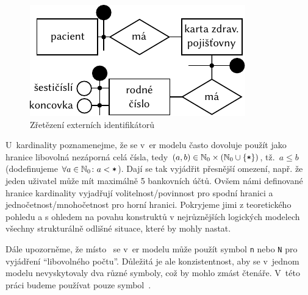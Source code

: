 \begin{figure}[!htb]
  \centering
  \includegraphics[width=\maxwidth{\textwidth}]{../img/er-model/external-id-chain.pdf}
  \caption{Zřetězení externích identifikátorů}
  \label{fig:er-external-identifier-chain}
\end{figure}

U~kardinality poznamenejme, že se v~\acrshort{er} modelu často dovoluje použít jako hranice libovolná nezáporná celá čísla, tedy $(a, b)\in \mathbb N_0\times \left(\mathbb N_0 \cup \left\{\texttt{*}\right\}\right)$, tž.~$a\leq b$ (dodefinujeme $\forall a\in\mathbb N_0\colon a < \texttt{*}$).
Dají se tak vyjádřit přesnější omezení, např. že jeden uživatel může mít maximálně 5 bankovních účtů.
Ovšem námi definované hranice kardinality vyjadřují volitelnost/povinnost pro spodní hranici a jednočetnost/mnohočetnost pro horní hranici.
Pokryjeme jimi z teoretického pohledu a s ohledem na povahu konstruktů v nejrůznějších logických modelech všechny strukturálně odlišné situace, které by mohly nastat.

Dále upozorněme, že místo~\many{} se v~\acrshort{er} modelu může použít symbol \texttt{n} nebo \texttt{N} pro vyjádření \enquote{libovolného počtu}.
Důležitá je ale konzistentnost, aby se v~jednom modelu nevyskytovaly dva různé symboly, což by mohlo zmást čtenáře.
V~této práci budeme používat pouze symbol~\many{}.

